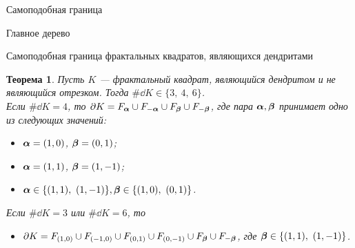 \documentclass[aspectratio=1610, 10pt, notheorems]{beamer}
\newtheorem{theorem}     {Теорема}
\newtheorem{definition}  {Определение}
\begin{document}
\begin{frame}{Самоподобная граница}
\end{frame}


\begin{frame}{Главное дерево}
\end{frame}


\begin{frame}{Самоподобная граница  фрактальных квадратов, являющихся дендритами}
\begin{theorem}\label{ssboundary}
Пусть $K$ --- фрактальный квадрат, являющийся дендритом и не являющийся отрезком.
Тогда $\#\dd K\in\{3,\ 4,\ 6\}$. \\
Если $\#\dd K=4$, то  $\partial K=F_{\bm{\alpha}}\cup F_{-{\bm{\alpha}}}\cup F_{\bm{\beta}}\cup F_{-{\bm{\beta}}}$, где   пара  ${\bm{\alpha}},{\bm{\beta}}$ принимает одно из следующих значений:
	\begin{itemize}[nolistsep]
	\item[{\bf A.}] ${\bm{\alpha}}=(1,0)$, $ {\bm{\beta}}=(0,1)$;
	\item[{\bf B.}] ${\bm{\alpha}}=(1,1)$, $ {\bm{\beta}}=(1,-1)$;
	\item[{\bf C.}] $\bma\in\{(1,1),\ (1,-1)\},\bmb\in\{(1,0),\ (0,1)\}$.
	\end{itemize}
 Если $\#\dd K=3$ или $\#\dd K=6$, то
\begin{itemize}[nolistsep]
	\item[{\bf D.}] $\partial K=F_{(1,0)}\cup F_{(-1,0)}\cup F_{(0,1)}\cup F_{(0,-1)}\cup F_{\bm{\beta}}\cup F_{-{\bm{\beta}}}$, где ${\bm{\beta}}\in\{(1,1),\ (1,-1)\}$.
	\end{itemize}
\end{theorem}
\end{frame}
\end{document}

